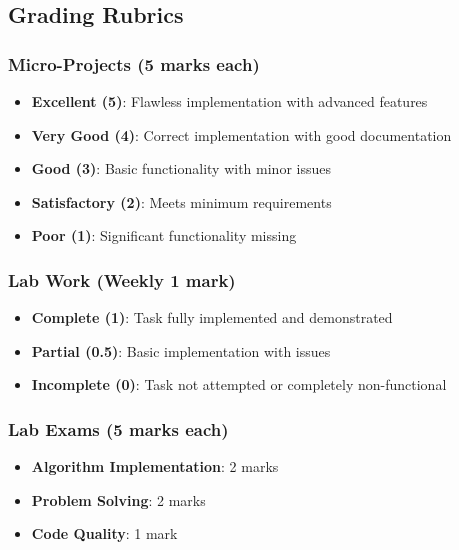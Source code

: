 \documentclass[
  letterpaper,
  DIV=11,
  numbers=noendperiod]{scrreprt}
\providecommand{\tightlist}{%
  \setlength{\itemsep}{0pt}\setlength{\parskip}{0pt}}
\begin{document}
\subsection*{Grading Rubrics}\label{grading-rubrics}

\subsubsection*{Micro-Projects (5 marks
each)}\label{micro-projects-5-marks-each}

\begin{itemize}
\tightlist
\item
  \textbf{Excellent (5)}: Flawless implementation with advanced features
\item
  \textbf{Very Good (4)}: Correct implementation with good documentation
\item
  \textbf{Good (3)}: Basic functionality with minor issues
\item
  \textbf{Satisfactory (2)}: Meets minimum requirements
\item
  \textbf{Poor (1)}: Significant functionality missing
\end{itemize}

\subsubsection*{Lab Work (Weekly 1 mark)}\label{lab-work-weekly-1-mark}

\begin{itemize}
\tightlist
\item
  \textbf{Complete (1)}: Task fully implemented and demonstrated
\item
  \textbf{Partial (0.5)}: Basic implementation with issues
\item
  \textbf{Incomplete (0)}: Task not attempted or completely
  non-functional
\end{itemize}

\subsubsection*{Lab Exams (5 marks each)}\label{lab-exams-5-marks-each}

\begin{itemize}
\tightlist
\item
  \textbf{Algorithm Implementation}: 2 marks
\item
  \textbf{Problem Solving}: 2 marks
\item
  \textbf{Code Quality}: 1 mark
\end{itemize}
\end{document}
